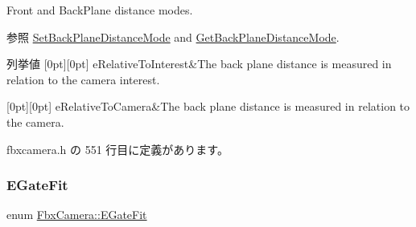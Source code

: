 Front and Back\+Plane distance modes. \begin{DoxySeeAlso}{参照}
\hyperlink{class_fbx_camera_a47cacdb816666eebadb56febbc3fa406}{Set\+Back\+Plane\+Distance\+Mode} and \hyperlink{class_fbx_camera_a862928086a5ae50086651ce6b96aa8c0}{Get\+Back\+Plane\+Distance\+Mode}. 
\end{DoxySeeAlso}
\begin{DoxyEnumFields}{列挙値}
[0pt][0pt]{}\mbox{\label{class_fbx_camera_a79e74898d117e741c3fbd10b1ef21c79ad53d9e2ed112ce41f81d62da18788135}} 
e\+Relative\+To\+Interest&The back plane distance is measured in relation to the camera interest. \\
\hline

[0pt][0pt]{}\mbox{\label{class_fbx_camera_a79e74898d117e741c3fbd10b1ef21c79a98897f48447c5d2ac67a64fe7dfdd3a3}} 
e\+Relative\+To\+Camera&The back plane distance is measured in relation to the camera. \\
\hline

\end{DoxyEnumFields}


 fbxcamera.\+h の 551 行目に定義があります。

\mbox{\label{class_fbx_camera_aeef0bf29c16fe5f08815fb33402330dd}} 
\subsubsection{\texorpdfstring{E\+Gate\+Fit}{EGateFit}}
{\footnotesize\ttfamily enum \hyperlink{class_fbx_camera_aeef0bf29c16fe5f08815fb33402330dd}{Fbx\+Camera\+::\+E\+Gate\+Fit}}

